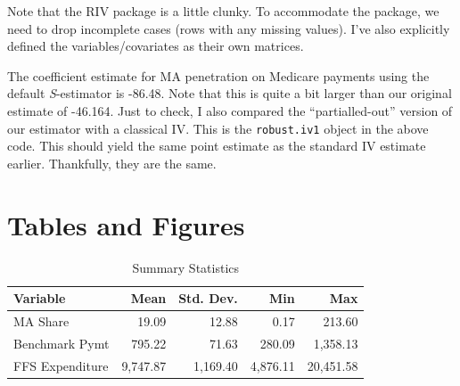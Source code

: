 \documentclass[
  12pt,
]{article}
\begin{document}

Note that the RIV package is a little clunky. To accommodate the package, we need to drop incomplete cases (rows with any missing values). I've also explicitly defined the variables/covariates as their own matrices.

The coefficient estimate for MA penetration on Medicare payments using the default \emph{S}-estimator is -86.48. Note that this is quite a bit larger than our original estimate of -46.164. Just to check, I also compared the ``partialled-out'' version of our estimator with a classical IV. This is the \texttt{robust.iv1} object in the above code. This should yield the same point estimate as the standard IV estimate earlier. Thankfully, they are the same.

\newpage
{}

\hypertarget{tables-and-figures}{%
\section{Tables and Figures}\label{tables-and-figures}}

\begin{table}[h]

\caption{\label{tab:sum-stats}Summary Statistics}
\centering
\begin{tabular}[t]{lrrrr}
\toprule
Variable & Mean & Std. Dev. & Min & Max\\
\midrule
MA Share & 19.09 & 12.88 & 0.17 & 213.60\\
Benchmark Pymt & 795.22 & 71.63 & 280.09 & 1,358.13\\
FFS Expenditure & 9,747.87 & 1,169.40 & 4,876.11 & 20,451.58\\
\bottomrule
\end{tabular}
\end{table}

\newpage
\end{document}
